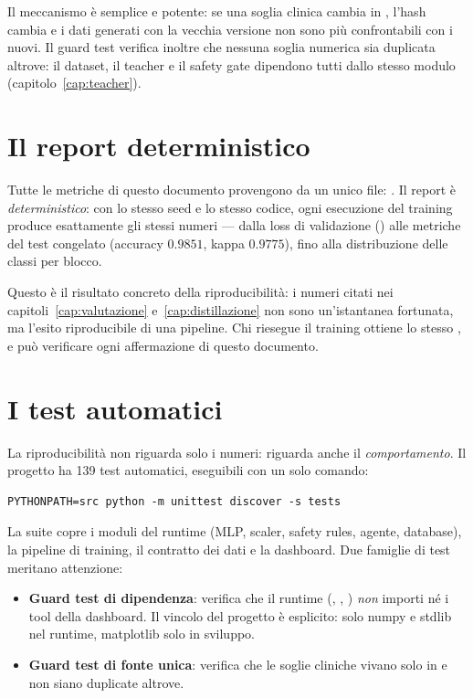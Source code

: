 Il meccanismo è semplice e potente: se una soglia clinica cambia in
, l'hash cambia e i dati generati con la vecchia
versione non sono più confrontabili con i nuovi. Il guard test
 verifica inoltre che nessuna soglia
numerica sia duplicata altrove: il dataset, il teacher e il safety gate
dipendono tutti dallo stesso modulo (capitolo~\ref{cap:teacher}).

\section{Il report deterministico}\label{sec:report-deterministico}

Tutte le metriche di questo documento provengono da un unico file:
. Il report è \emph{deterministico}: con lo
stesso seed e lo stesso codice, ogni esecuzione del training produce
esattamente gli stessi numeri — dalla loss di validazione
() alle metriche del test congelato
(accuracy $0.9851$, kappa $0.9775$), fino alla distribuzione delle classi
per blocco.

Questo è il risultato concreto della riproducibilità: i numeri citati nei
capitoli~\ref{cap:valutazione} e~\ref{cap:distillazione} non sono
un'istantanea fortunata, ma l'esito riproducibile di una pipeline. Chi
riesegue il training ottiene lo stesso , e può
verificare ogni affermazione di questo documento.

\section{I test automatici}\label{sec:test-automatici}

La riproducibilità non riguarda solo i numeri: riguarda anche il
\emph{comportamento}. Il progetto ha 139 test automatici, eseguibili con
un solo comando:

\begin{lstlisting}[caption={Esecuzione della suite di test del progetto.}]
PYTHONPATH=src python -m unittest discover -s tests
\end{lstlisting}

La suite copre i moduli del runtime (MLP, scaler, safety rules, agente,
database), la pipeline di training, il contratto dei dati e la dashboard.
Due famiglie di test meritano attenzione:

\begin{itemize}
  \item \textbf{Guard test di dipendenza}: 
        verifica che il runtime (, ,
        ) \emph{non} importi  né i tool
        della dashboard. Il vincolo del progetto è esplicito: solo numpy e
        stdlib nel runtime, matplotlib solo in sviluppo.
  \item \textbf{Guard test di fonte unica}: 
        verifica che le soglie cliniche vivano solo in
         e non siano duplicate altrove.
\end{itemize}

